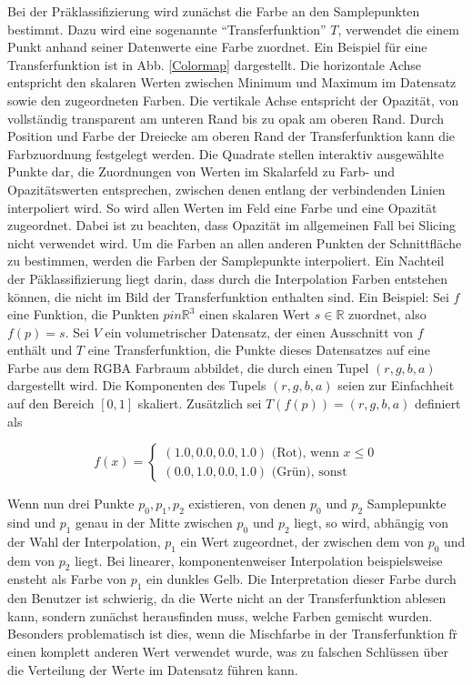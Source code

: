 \documentclass[a4paper,fontsize=12pt,toc=bib,halfparskip]{scrartcl}
\begin{document}
Bei der Pr\"aklassifizierung wird zun\"achst die Farbe  an den Samplepunkten bestimmt. Dazu wird eine sogenannte ``Transferfunktion'' $T$, verwendet die einem Punkt anhand seiner Datenwerte eine Farbe zuordnet. Ein Beispiel f\"ur eine Transferfunktion ist in Abb. \ref{Colormap} dargestellt. Die horizontale Achse entspricht den skalaren Werten zwischen Minimum und Maximum im Datensatz sowie den zugeordneten Farben. Die vertikale Achse entspricht der Opazit\"at, von vollst\"andig transparent am unteren Rand bis zu opak am oberen Rand. Durch Position und Farbe der Dreiecke am oberen Rand der Transferfunktion kann die Farbzuordnung festgelegt werden. Die Quadrate stellen interaktiv ausgew\"ahlte Punkte dar, die Zuordnungen von Werten im Skalarfeld zu Farb- und Opazit\"atswerten entsprechen, zwischen denen entlang der verbindenden Linien interpoliert wird. So wird allen Werten im Feld eine Farbe und eine Opazit\"at zugeordnet. Dabei ist zu beachten, dass Opazit\"at im allgemeinen Fall bei Slicing nicht verwendet wird. Um die Farben an allen anderen Punkten der Schnittfl\"ache zu bestimmen, werden die Farben der Samplepunkte interpoliert. Ein Nachteil der P\"aklassifizierung liegt darin, dass durch die Interpolation Farben entstehen k\"onnen, die nicht im Bild der Transferfunktion enthalten sind. Ein Beispiel: Sei $f$ eine Funktion, die Punkten $p in \mathbb{R}^3$ einen skalaren Wert $s \in \mathbb{R}$ zuordnet, also $f(p) = s$. Sei $V$ ein volumetrischer Datensatz, der einen Ausschnitt von $f$ enth\"alt und $T$ eine Transferfunktion, die Punkte dieses Datensatzes auf eine Farbe aus dem RGBA Farbraum abbildet, die durch einen Tupel $(r,g,b,a)$ dargestellt wird. Die Komponenten des Tupels $(r,g,b,a)$ seien zur Einfachheit auf den Bereich $[0, 1]$ skaliert. Zus\"atzlich sei $T(f(p)) = (r,g,b,a)$ definiert als 

\begin{equation}
	f(x)= 
	\begin{cases}
		(1.0, 0.0, 0.0, 1.0)\text{ (Rot), wenn } x\leq 0\\
		(0.0, 1.0, 0.0, 1.0)\text{ (Gr\"un), sonst}
	\end{cases}
\end{equation}

Wenn nun drei Punkte $p_0, p_1, p_2$ existieren, von denen $p_0$ und $p_2$ Samplepunkte sind und $p_1$ genau in der Mitte zwischen $p_0$ und $p_2$ liegt, so wird, abh\"angig von der Wahl der Interpolation, $p_1$ ein Wert zugeordnet, der zwischen dem von $p_0$ und dem von $p_2$ liegt. Bei linearer, komponentenweiser Interpolation beispielsweise ensteht als Farbe von $p_1$ ein dunkles Gelb. Die Interpretation dieser Farbe durch den Benutzer ist schwierig, da die Werte nicht an der Transferfunktion ablesen kann, sondern zun\"achst herausfinden muss, welche Farben gemischt wurden. Besonders problematisch ist dies, wenn die Mischfarbe in der Transferfunktion f\"r einen komplett anderen Wert verwendet wurde, was zu falschen Schl\"ussen \"uber die Verteilung der Werte im Datensatz f\"uhren kann.
\end{document}
